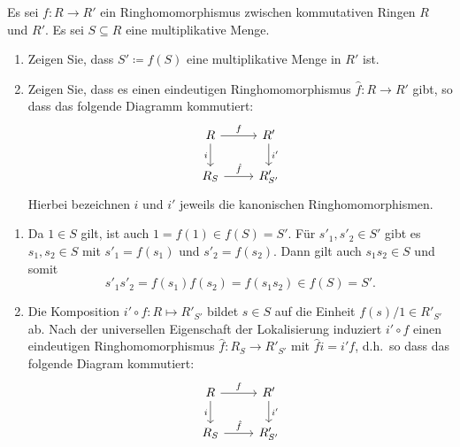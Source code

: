 \begin{question}[subtitle = Funktorialität von Lokalisierung]
  Es sei $f \colon R \to R'$ ein Ringhomomorphismus zwischen kommutativen Ringen $R$ und $R'$.
  Es sei $S \subseteq R$ eine multiplikative Menge.
  \begin{enumerate}
    \item
      Zeigen Sie, dass $S' \coloneqq f(S)$ eine multiplikative Menge in $R'$ ist.
    \item
      Zeigen Sie, dass es einen eindeutigen Ringhomomorphismus $\hat{f} \colon R \to R'$ gibt, so dass das folgende Diagramm kommutiert:
      \[
        \begin{tikzcd}[ampersand replacement=\&]
              R
              \arrow{r}{f}
              \arrow[swap]{d}{i}
          \&  R'
              \arrow{d}{i'}
          \\
              R_S
              \arrow{r}{\hat{f}}
          \&  R'_{S'}
        \end{tikzcd}
      \]
      Hierbei bezeichnen $i$ und $i'$ jeweils die kanonischen Ringhomomorphismen.
  \end{enumerate}
\end{question}


\begin{solution}
  \begin{enumerate}
    \item
      Da $1 \in S$ gilt, ist auch $1 = f(1) \in f(S) = S'$.
      Für $s'_1, s'_2 \in S'$ gibt es $s_1, s_2 \in S$ mit $s'_1 = f(s_1)$ und $s'_2 = f(s_2)$.
      Dann gilt auch $s_1 s_2 \in S$ und somit
      \[
          s'_1 s'_2
        = f(s_1) f(s_2)
        = f(s_1 s_2) \in f(S)
        = S'. 
      \]
    \item
      Die Komposition $i' \circ f \colon R \mapsto R'_{S'}$ bildet $s \in S$ auf die Einheit $f(s)/1 \in R'_{S'}$
      ab.
      Nach der universellen Eigenschaft der Lokalisierung induziert $i' \circ f$ einen eindeutigen Ringhomomorphismus $\hat{f} \colon R_S \to R'_{S'}$ mit $\hat{f} i = i' f$, d.h.\ so dass das folgende Diagram kommutiert:
      \[
        \begin{tikzcd}[ampersand replacement = \&]
              R
              \arrow{r}{f}
              \arrow[swap]{d}{i}
          \&  R'
              \arrow{d}{i'}
          \\
              R_S
              \arrow{r}{\hat{f}}
          \&  R'_{S'}
        \end{tikzcd}
      \]
  \end{enumerate}
\end{solution}



